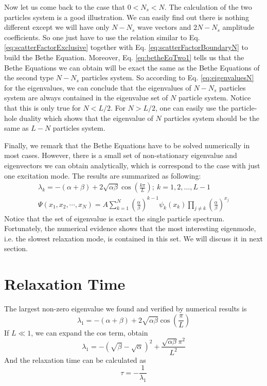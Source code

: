 \documentclass[12pt,a4paper]{article}
\begin{document}
Now let us come back to the case that $0<N_s<N$. The calculation of the two
particles system is a good illustration. We can easily find out there is
nothing different except we will have only $N-N_s$ wave vectors and $2N-N_s$
amplitude coefficients. So one just have to use the relation similar to Eq.
\eqref{eq:scatterFactorExclusive} together with Eq.
\eqref{eq:scatterFactorBoundaryN} to build the Bethe Equation. Moreover, Eq.
\eqref{eq:betheEqTwo1} tells us that the Bethe Equations we can obtain will be
exact the same as the Bethe Equations of the second type $N-N_s$ particles
system. So according to Eq. \eqref{eq:eigenvaluesN} for the eigenvalues, we can
conclude that the eigenvalues of $N-N_s$ particles system are always contained
in the eigenvalue set of $N$ particle system. Notice that this is only true for
$N<L/2$. For $N>L/2$, one can easily use the particle-hole duality which shows
that the eigenvalue of $N$ particles system should be the same as $L-N$
particles system.

Finally, we remark that the Bethe Equations have to be solved numerically in
most cases. However, there is a small set of non-stationary eigenvalue and
eigenvectors we can obtain analytically, which is correspond to the case with
just one excitation mode. The results are summarized as following:  
\begin{subequations}
    \label{eq:eigenN}
    \begin{eqnarray}
        \label{eq:eigenvaluesN}
        \lambda_k  = 
        -(\alpha+\beta) + 2\sqrt{\alpha\beta}\cos(\frac{k\pi}{L});
        ~k=1,2,\dots, L-1  \\
        \label{eq:eigenvectorsN}
        \Psi(x_1, x_2, \cdots, x_N)  =  A \sum_{k=1}^N
        \left(\frac{\alpha}{\beta}\right)^{k-1} \psi_k(x_k)\prod_{j\neq k} 
         \left(\frac{\alpha}{\beta}\right)^{x_j}
    \end{eqnarray}
\end{subequations}
Notice that the set of eigenvalue is exact the single particle spectrum.
Fortunately, the numerical evidence shows that the most interesting
eigenmode, i.e. the slowest relaxation mode, is contained in this set. 
We will discuss it in next section. 

\section{Relaxation Time}
\label{sec:relaxation_time}

The largest non-zero eigenvalue we found and verified by numerical results is 
\begin{equation}
    \label{eq:largestEigenvalue}
    \lambda_1 = -(\alpha+\beta) +
    2\sqrt{\alpha\beta}\cos(\frac{\pi}{L})
\end{equation}
If $L\ll 1$, we can expand the cos term, obtain 
\begin{equation}
    \label{eq:largestEigenvalueExpanded}
    \lambda_1 = -(\sqrt{\beta}-\sqrt{\alpha})^2 +
    \frac{\sqrt{\alpha\beta}\pi^2}{L^2}
\end{equation}
And the relaxation time can be calculated as 
\begin{equation}
    \label{eq:relaxationTime}
    \tau = -\frac{1}{\lambda_1}
\end{equation}
\end{document}
